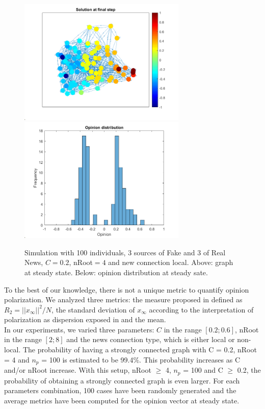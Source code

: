 \begin{figure}[!t]
\centering
\includegraphics[width=8cm]{Figures/Exp20_graphc.png}
\includegraphics[width=8cm]{Figures/Exp20_hystc.png}
\caption{Simulation with 100 individuals, 3 sources of Fake and 3 of Real News, $C=0.2$, nRoot$=4$ and new connection local. Above: graph at steady state. Below: opinion distribution at steady sate.}
\label{pics:exp20}
\end{figure}

To the best of our knowledge, there is not a unique metric to quantify opinion polarization. We analyzed three metrics: the measure proposed in \cite{Matakos2017} defined as $R_2 = ||x_{\infty}||^2/ N$, the standard deviation of $x_{\infty}$ according to the interpretation of polarization as dispersion exposed in \cite{Bramsona2016} and the mean.\\

In our experiments, we varied three parameters: $C$ in the range $[0.2; 0.6]$, nRoot in the range $[2; 8]$ and the news connection type, which is either local or non-local. The probability of having a strongly connected graph with C = 0.2, nRoot = 4 and $n_p$ = 100 is estimated to be 99.4$\%$. This probability increases as C and/or nRoot increase. With this setup, nRoot $\geq$ 4, $n_p$ = 100 and C $\geq$ 0.2, the probability of obtaining a strongly connected graph is even larger. For each parameters combination, 100 cases have been randomly generated and the average metrics have been computed for the opinion vector at steady state.\\

